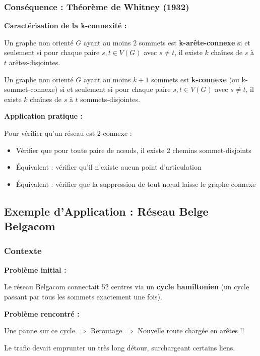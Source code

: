 \documentclass[12pt,a4paper]{article}
\begin{document}
\subsubsection{Conséquence : Théorème de Whitney (1932)}

\begin{important}
\textbf{Caractérisation de la k-connexité :}

Un graphe non orienté $G$ ayant au moins 2 sommets est \textcolor{titrebleu}{\textbf{k-arête-connexe}} si et seulement si pour chaque paire $s, t \in V(G)$ avec $s \neq t$, il existe $k$ chaînes de $s$ à $t$ arêtes-disjointes.

Un graphe non orienté $G$ ayant au moins $k+1$ sommets est \textcolor{defvert}{\textbf{k-connexe}} (ou k-sommet-connexe) si et seulement si pour chaque paire $s, t \in V(G)$ avec $s \neq t$, il existe $k$ chaînes de $s$ à $t$ sommets-disjointes.
\end{important}

\begin{astuce}
\textbf{Application pratique :}

Pour vérifier qu'un réseau est 2-connexe :
\begin{itemize}
    \item Vérifier que pour toute paire de nœuds, il existe 2 chemins sommet-disjoints
    \item Équivalent : vérifier qu'il n'existe aucun point d'articulation
    \item Équivalent : vérifier que la suppression de tout nœud laisse le graphe connexe
\end{itemize}
\end{astuce}

\newpage
\subsection{Exemple d'Application : Réseau Belge Belgacom}

\subsubsection{Contexte}

\begin{exemple}
\textbf{Problème initial :}

Le réseau Belgacom connectait 52 centres via un \textcolor{titrebleu}{\textbf{cycle hamiltonien}} (un cycle passant par tous les sommets exactement une fois).

\textbf{Problème rencontré :}

Une panne sur ce cycle $\Rightarrow$ Reroutage $\Rightarrow$ Nouvelle route chargée en arêtes !!

Le trafic devait emprunter un très long détour, surchargeant certains liens.
\end{exemple}
\end{document}
